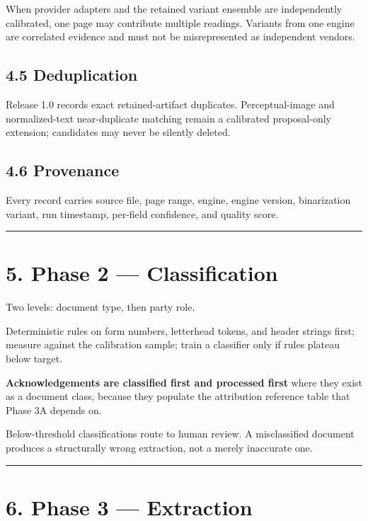\documentclass[
]{article}
\begin{document}
When provider adapters and the retained variant ensemble are
independently calibrated, one page may contribute multiple readings.
Variants from one engine are correlated evidence and must not be
misrepresented as independent vendors.

\subsection{4.5 Deduplication}\label{deduplication}

Release 1.0 records exact retained-artifact duplicates. Perceptual-image
and normalized-text near-duplicate matching remain a calibrated
proposal-only extension; candidates may never be silently deleted.

\subsection{4.6 Provenance}\label{provenance}

Every record carries source file, page range, engine, engine version,
binarization variant, run timestamp, per-field confidence, and quality
score.

\begin{center}\rule{0.5\linewidth}{0.5pt}\end{center}

\section{5. Phase 2 --- Classification}\label{phase-2-classification}

Two levels: document type, then party role.

Deterministic rules on form numbers, letterhead tokens, and header
strings first; measure against the calibration sample; train a
classifier only if rules plateau below target.

\textbf{Acknowledgements are classified first and processed first} where
they exist as a document class, because they populate the attribution
reference table that Phase 3A depends on.

Below-threshold classifications route to human review. A misclassified
document produces a structurally wrong extraction, not a merely
inaccurate one.

\begin{center}\rule{0.5\linewidth}{0.5pt}\end{center}

\section{6. Phase 3 --- Extraction}\label{phase-3-extraction}
\end{document}
